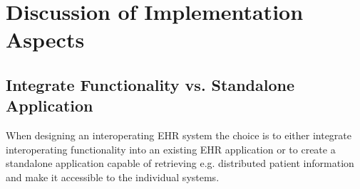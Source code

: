 \documentclass[14pt]{article}
\begin{document}

\newpage

\section{Discussion of Implementation Aspects}%
\label{sec:Results}
\label{sec:resultsEndUser}

\subsection{Integrate Functionality vs. Standalone Application} %
When designing an interoperating \gls{EHR} system the choice is to either integrate interoperating functionality into an existing \gls{EHR} application or to create a standalone application capable of retrieving e.g. distributed patient information and make it accessible to the individual systems.
\end{document}
